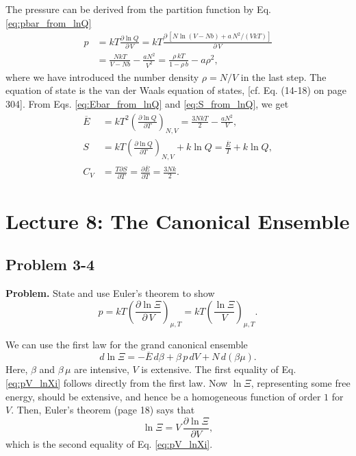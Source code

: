 \documentclass[twocolumn, 10pt]{article}
\numberwithin{equation}{section}
\newenvironment{problem}
{\par\medskip \color{problemblue}
  \textbf{Problem. }\ignorespaces}
{\medskip}
\newenvironment{solution}[1][\empty]
{\par\medskip\sffamily
  \textbf{\ifx\empty#1{Solution.}\relax\else{#1}\fi} \ignorespaces}
{\medskip}
\begin{document}
\begin{solution}
The pressure can be derived from the partition function
by Eq. \eqref{eq:pbar_from_lnQ}
%
\begin{align*}
p &=
  kT \frac{ \partial \ln Q } { \partial \, V }
=
  kT \frac{ \partial \, [ N \ln (V - N b)
   + a \, N^2 / (V k T)] }
  { \partial \, V }
\\
&=
  \frac{ N k T } { V - N b} - \frac{ a N^2 }{ V^2 }
=
  \frac{ \rho \, k T } { 1 - \rho \, b} - a \rho^2
,
\end{align*}
%
where we have introduced
the number density $\rho = N/V$ in the last step.
%
The equation of state is the van der Waals equation of states,
  [cf. Eq. (14-18) on page 304].
%
From Eqs. \eqref{eq:Ebar_from_lnQ} and \eqref{eq:S_from_lnQ},
we get
\begin{align*}
\overline E
&=
    kT^2 \left(
      \frac{ \partial \ln Q }
           { \partial T }
    \right)_{N, V}
=
  \frac{ 3 N k T }{2}
  -\frac{ a N^2 } { V}
,
\\
S
&=
    kT \left(
      \frac{ \partial \ln Q }
           { \partial T }
    \right)_{N, V}
    + k \ln Q
=
  \frac{ \overline E } { T }
  + k \ln Q
,
\\
C_V
&=
\frac{ T \partial S } { \partial T }
=
\frac{ \partial \overline E } { \partial T }
= \frac{ 3 N k}{2}
.
\end{align*}
\end{solution}

\section{Lecture 8: The Canonical Ensemble}

\subsection{Problem 3-4}

\begin{problem}
  State and use Euler's theorem to show
  \begin{equation}
  p
  = kT \left(
    \frac{ \partial \ln \Xi } { \partial \, V }
    \right)_{\mu, T}
  = kT \left(
    \frac{ \ln \Xi } { V }
    \right)_{\mu, T}
  .
    \label{eq:pV_lnXi}
  \end{equation}
\end{problem}

\begin{solution}
We can use the first law for the grand canonical ensemble
$$
d\ln\Xi = -\overline E \, d\beta + \beta \, p \, d V + N \, d(\beta\mu).
$$
Here, $\beta$ and $\beta\,\mu$
are intensive, $V$ is extensive.
%
The first equality of Eq. \eqref{eq:pV_lnXi}
follows directly from the first law.
%
Now $\ln\Xi$, representing some free energy,
should be extensive,
and hence be a homogeneous function of order $1$
for $V$.
%
Then, Euler's theorem (page 18) says that
$$
\ln\Xi = V \, \frac{ \partial \ln \Xi } { \partial V },
$$
which is the second equality of Eq. \eqref{eq:pV_lnXi}.
\end{solution}
\end{document}
